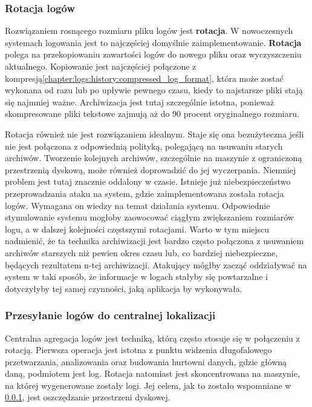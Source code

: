         \subsubsection{Rotacja logów}
        \label{chapter:logs:collecting:rotation}
        Rozwiązaniem rosnącego rozmiaru pliku logów jest \textbf{rotacja}. W nowoczesnych systemach logowania
        jest to najczęściej domyślnie zaimplementowanie. \textbf{Rotacja} polega na przekopiowaniu 
        zawartości logów do nowego pliku oraz wyczyszczeniu aktualnego. Kopiowanie jest najczęściej połączone
        z kompresją\ref{chapter:logs:history:compressed_log_format}, która może zostać wykonana od razu lub po upływie pewnego czasu, kiedy to najstarsze
        pliki stają się najmniej ważne. Archiwizacja jest tutaj szczególnie istotna, ponieważ
        skompresowane pliki tekstowe zajmują aż do 90 procent oryginalnego rozmiaru.
        
        Rotacja również nie jest rozwiązaniem idealnym. Staje się ona bezużyteczna jeśli nie jest połączona
        z odpowiednią polityką, polegającą na usuwaniu starych archiwów. Tworzenie kolejnych archiwów,
        szczególnie na maszynie z ograniczoną przestrzenią dyskową, może również doprowadzić do jej wyczerpania.
        Niemniej problem jest tutaj znacznie oddalony w czasie. Istnieje już niebezpieczeństwo przeprowadzania
        ataku na system, gdzie zaimplementowana została rotacja logów. Wymagana on wiedzy na temat działania systemu.
        Odpowiednie stymulowanie systemu mogłoby zaowocować ciągłym zwiększaniem rozmiarów logu, a w dalszej kolejności
        częstszymi rotacjami. Warto w tym miejscu nadmienić, że ta technika archiwizacji jest bardzo często
        połączona z usuwaniem archiwów starszych niż pewien okres czasu lub, co bardziej niebezpieczne, będących
        rezultatem n-tej archiwizacji. Atakujący mógłby zacząć oddziaływać na system w taki sposób, że informacje
        w logach stałyby się powtarzalne i dotyczyłyby tej samej czynności, jaką aplikacja by wykonywała.
        
        \subsubsection{Przesyłanie logów do centralnej lokalizacji}
        \label{chapter:logs:collecting:central_location}
        Centralna agregacja logów jest techniką, którą często stosuje się w połączeniu z rotacją.
        Pierwsza operacja jest istotna z punktu widzenia długofalowego przetwarzania, analizowania oraz
        budowania hurtowni danych, gdzie główną daną, podmiotem jest log. Rotacja natomiast jest skoncentrowana
        na maszynie, na której wygenerowane zostały logi. Jej celem, jak to zostało wspomniane w \ref{chapter:logs:collecting:rotation},
        jest oszczędzanie przestrzeni dyskowej.
    